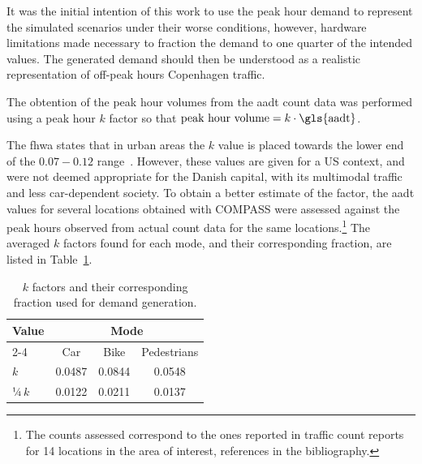 It was the initial intention of this work to use the peak hour demand to represent the simulated scenarios under their worse conditions, however, hardware limitations made necessary to fraction the demand to one quarter of the intended values. The generated demand should then be understood as a realistic representation of off-peak hours Copenhagen traffic.

The obtention of the peak hour volumes from the \gls{aadt} count data was performed using a peak hour $k$ factor so that $\text{peak hour volume} = k \cdot \text{\gls{aadt}}$.

The \gls{fhwa} states that in urban areas the $k$ value is placed towards the lower end of the $0.07-0.12$ range~\cite{FHWA2018}. However, these values are given for a US context, and were not deemed appropriate for the Danish capital, with its multimodal traffic and less car-dependent society. To obtain a better estimate of the factor, the \gls{aadt} values for several locations obtained with COMPASS were assessed against the peak hours observed from actual count data for the same locations.\footnote{
        The counts assessed correspond to the ones reported in traffic count reports for 14 locations in the area of interest, references \cite{kk_767, kk_9691, kk_9758, kk_972, kk_Ny, kk_7126, kk_90, kk_397, kk_44, kk_614, kk_631, kk_91, kk_11, kk_7005, kk_270, kk_19, kk_5, kk_69} in the bibliography.
} The averaged $k$ factors found for each mode, and their corresponding fraction, are listed in Table~\ref{tab:k_factors}.

\begin{table}[]
  \centering
\caption{$k$ factors and their corresponding fraction used for demand generation.}
\label{tab:k_factors}
\begin{tabular}{lccc}
\hline
\multicolumn{1}{c}{\multirow{2}{*}{\textbf{Value}}} & \multicolumn{3}{c}{\textbf{Mode}}                   \\
\cmidrule(l){2-4}
\multicolumn{1}{c}{}                                & Car & Bike & Pedestrians \\ \hline
$k$                                                 & 0.0487       & 0.0844        & 0.0548               \\
¼\,$k$                                     & 0.0122       & 0.0211        & 0.0137              \\ \bottomrule

\end{tabular}
\end{table}  

